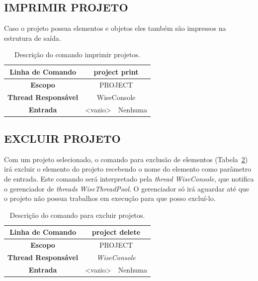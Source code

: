 \subsection{IMPRIMIR PROJETO}\label{sec:print_projects}

 Caso o projeto possua elementos e objetos eles também são impressos na estrutura de saída.

\begin{center}
	\begin{table}[!htbp]
		\begin{tabularx}{\textwidth}{c|c|X}
			\toprule
			\textbf{Linha de Comando} & \multicolumn{2}{c}{project print} \\
			\midrule
			\textbf{Escopo} & \multicolumn{2}{c}{PROJECT} \\
			\hline
			\textbf{Thread Responsável} & \multicolumn{2}{c}{WiseConsole} \\
			\hline
			\textbf{Entrada} & <vazio> & Nenhuma \\
			\bottomrule
		\end{tabularx}
		\caption{Descrição do comando imprimir projetos.}
		\label{tab:print_projects}
	\end{table}
\end{center}

\subsection{EXCLUIR PROJETO}\label{sec:delete_projects}

Com um projeto selecionado, o comando para exclusão de elementos (Tabela~\ref{tab:delete_projects}) irá excluir o elemento do projeto recebendo o nome do elemento como parâmetro de entrada. Este comando será interpretado pela \textit{thread} \textit{WiseConsole}, que notifica o gerenciador de \textit{threads} \textit{WiseThreadPool}. O gerenciador só irá aguardar até que o projeto não possua trabalhos em execução para que posso excluí-lo.

\begin{center}
	\begin{table}[!htbp]
		\begin{tabularx}{\textwidth}{c|c|X}
			\toprule
			\textbf{Linha de Comando} & \multicolumn{2}{c}{project delete} \\
			\midrule
			\textbf{Escopo} & \multicolumn{2}{c}{PROJECT} \\
			\hline
			\textbf{Thread Responsável} & \multicolumn{2}{c}{\textit{WiseConsole}} \\
			\hline
			\textbf{Entrada} & <vazio> & Nenhuma \\
			\bottomrule
		\end{tabularx}
		\caption{Descrição do comando para excluir projetos.}
		\label{tab:delete_projects}
	\end{table}
\end{center}

